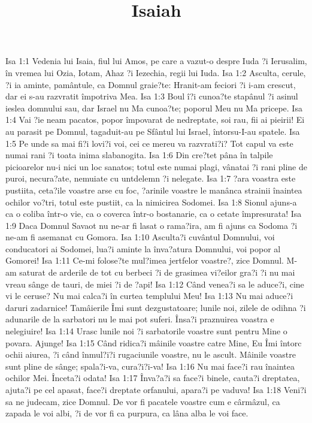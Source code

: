 

\title{Isaiah}

Isa 1:1  Vedenia lui Isaia, fiul lui Amos, pe care a vazut-o despre Iuda ?i Ierusalim, în vremea lui Ozia, Iotam, Ahaz ?i Iezechia, regii lui Iuda.
Isa 1:2  Asculta, cerule, ?i ia aminte, pamântule, ca Domnul graie?te: Hranit-am feciori ?i i-am crescut, dar ei s-au razvratit împotriva Mea.
Isa 1:3  Boul î?i cunoa?te stapânul ?i asinul ieslea domnului sau, dar Israel nu Ma cunoa?te; poporul Meu nu Ma pricepe.
Isa 1:4  Vai ?ie neam pacatos, popor împovarat de nedreptate, soi rau, fii ai pieirii! Ei au parasit pe Domnul, tagaduit-au pe Sfântul lui Israel, întorsu-I-au spatele.
Isa 1:5  Pe unde sa mai fi?i lovi?i voi, cei ce mereu va razvrati?i? Tot capul va este numai rani ?i toata inima slabanogita.
Isa 1:6  Din cre?tet pâna în talpile picioarelor nu-i nici un loc sanatos; totul este numai plagi, vânatai ?i rani pline de puroi, necura?ate, nemuiate cu untdelemn ?i nelegate.
Isa 1:7  ?ara voastra este pustiita, ceta?ile voastre arse cu foc, ?arinile voastre le manânca strainii înaintea ochilor vo?tri, totul este pustiit, ca la nimicirea Sodomei.
Isa 1:8  Sionul ajuns-a ca o coliba într-o vie, ca o coverca într-o bostanarie, ca o cetate împresurata!
Isa 1:9  Daca Domnul Savaot nu ne-ar fi lasat o rama?ira, am fi ajuns ca Sodoma ?i ne-am fi asemanat cu Gomora.
Isa 1:10  Asculta?i cuvântul Domnului, voi conducatori ai Sodomei, lua?i aminte la înva?atura Domnului, voi popor al Gomorei!
Isa 1:11  Ce-mi folose?te mul?imea jertfelor voastre?, zice Domnul. M-am saturat de arderile de tot cu berbeci ?i de grasimea vi?eilor gra?i ?i nu mai vreau sânge de tauri, de miei ?i de ?api!
Isa 1:12  Când venea?i sa le aduce?i, cine vi le ceruse? Nu mai calca?i în curtea templului Meu!
Isa 1:13  Nu mai aduce?i daruri zadarnice! Tamâierile Îmi sunt dezgustatoare; lunile noi, zilele de odihna ?i adunarile de la sarbatori nu le mai pot suferi. Însa?i praznuirea voastra e nelegiuire!
Isa 1:14  Urasc lunile noi ?i sarbatorile voastre sunt pentru Mine o povara. Ajunge!
Isa 1:15  Când ridica?i mâinile voastre catre Mine, Eu Îmi întorc ochii aiurea, ?i când înmul?i?i rugaciunile voastre, nu le ascult. Mâinile voastre sunt pline de sânge; spala?i-va, cura?i?i-va!
Isa 1:16  Nu mai face?i rau înaintea ochilor Mei. Înceta?i odata!
Isa 1:17  Înva?a?i sa face?i binele, cauta?i dreptatea, ajuta?i pe cel apasat, face?i dreptate orfanului, apara?i pe vaduva!
Isa 1:18  Veni?i sa ne judecam, zice Domnul. De vor fi pacatele voastre cum e cârmâzul, ca zapada le voi albi, ?i de vor fi ca purpura, ca lâna alba le voi face.
